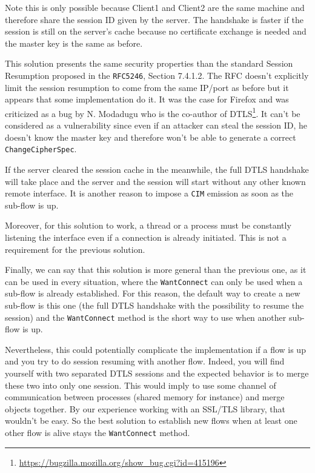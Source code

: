 Note this is only possible because Client1 and Client2 are the same machine and therefore share the session ID given by the server. The handshake is faster if the session is still on the server's cache because no certificate exchange is needed and the master key is the same as before.

This solution presents the same security properties than the standard Session Resumption proposed in the \texttt{RFC5246}\cite{RFC5246}, Section 7.4.1.2. The RFC doesn't explicitly limit the session resumption to come from the same IP/port as before but it appears that some implementation do it. It was the case for Firefox and was criticized as a bug by N. Modadugu who is the co-author of DTLS\footnote{\url{https://bugzilla.mozilla.org/show_bug.cgi?id=415196}}. It can't be considered as a vulnerability since even if an attacker can steal the session ID, he doesn't know the master key and therefore won't be able to generate a correct \texttt{ChangeCipherSpec}.

If the server cleared the session cache in the meanwhile, the full DTLS handshake will take place and the server and the session will start without any other known remote interface. It is another reason to impose a \texttt{CIM} emission as soon as the sub-flow is up.

Moreover, for this solution to work, a thread or a process must be constantly listening the interface even if a connection is already initiated. This is not a requirement for the previous solution.

Finally, we can say that this solution is more general than the previous one, as it can be used in every situation, where the \texttt{WantConnect} can only be used when a sub-flow is already established. For this reason, the default way to create a new sub-flow is this one (the full DTLS handshake with the possibility to resume the session) and the \texttt{WantConnect} method is the short way to use when another sub-flow is up.

Nevertheless, this could potentially complicate the implementation if a flow is up and you try to do session resuming with another flow. Indeed, you will find yourself with two separated DTLS sessions and the expected behavior is to merge these two into only one session. This would imply to use some channel of communication between processes (shared memory for instance) and merge objects together. By our experience working with an SSL/TLS library, that wouldn't be easy. So the best solution to establish new flows when at least one other flow is alive stays the \texttt{WantConnect} method.

